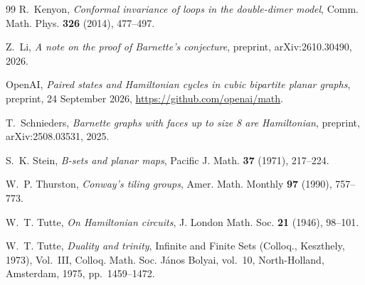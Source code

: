 \documentclass[a4paper]{amsart}
\numberwithin{equation}{section}
\theoremstyle{definition}
\begin{document}
\begin{thebibliography}{99}
R.~Kenyon, \emph{Conformal invariance of loops in the double-dimer model}, Comm. Math. Phys. \textbf{326} (2014), 477--497.

Z.~Li, \emph{A note on the proof of Barnette's conjecture}, preprint, arXiv:2610.30490, 2026.

OpenAI, \emph{Paired states and Hamiltonian cycles in cubic bipartite planar graphs}, preprint, 24 September 2026, \url{https://github.com/openai/math}.

T.~Schnieders, \emph{Barnette graphs with faces up to size 8 are Hamiltonian}, preprint, arXiv:2508.03531, 2025.

S.~K. Stein, \emph{B-sets and planar maps}, Pacific J. Math. \textbf{37} (1971), 217--224.

W.~P. Thurston, \emph{Conway's tiling groups}, Amer. Math. Monthly \textbf{97} (1990), 757--773.

W.~T. Tutte, \emph{On Hamiltonian circuits}, J. London Math. Soc. \textbf{21} (1946), 98--101.

W.~T. Tutte, \emph{Duality and trinity}, Infinite and Finite Sets (Colloq., Keszthely, 1973), Vol.~III, Colloq. Math. Soc. J\'anos Bolyai, vol.~10, North-Holland, Amsterdam, 1975, pp.~1459--1472.

\end{thebibliography}
\end{document}
